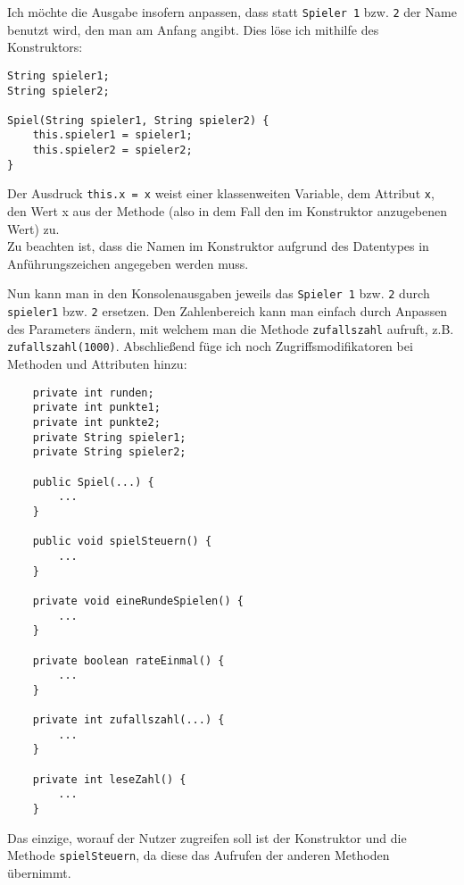 \documentclass{scrartcl}   %
\begin{document}
\begin{itemize}
    \barrow Ich möchte die Ausgabe insofern anpassen, dass statt \texttt{Spieler 1} bzw. \texttt{2} der Name benutzt wird, den man am Anfang angibt. Dies löse ich mithilfe des Konstruktors:\\
    \begin{lstlisting}
String spieler1;
String spieler2;
    
Spiel(String spieler1, String spieler2) {
    this.spieler1 = spieler1;
    this.spieler2 = spieler2;
}
    \end{lstlisting}
    
    Der Ausdruck \texttt{this.x = x} weist einer klassenweiten Variable, dem Attribut \texttt{x}, den Wert x aus der Methode (also in dem Fall den im Konstruktor anzugebenen Wert) zu.\\
    Zu beachten ist, dass die Namen im Konstruktor aufgrund des Datentypes in Anführungszeichen angegeben werden muss.
    
    Nun kann man in den Konsolenausgaben jeweils das \texttt{Spieler 1} bzw. \texttt{2} durch \texttt{spieler1} bzw. \texttt{2} ersetzen.
    \barrow Den Zahlenbereich kann man einfach durch Anpassen des Parameters ändern, mit welchem man die Methode \texttt{zufallszahl} aufruft, z.B. \texttt{zufallszahl(1000)}.
    \barrow Abschließend füge ich noch Zugriffsmodifikatoren bei Methoden und Attributen hinzu:
    
    \begin{lstlisting}
    private int runden;
    private int punkte1;
    private int punkte2;
    private String spieler1;
    private String spieler2;
    
    public Spiel(...) {
        ...
    }
    
    public void spielSteuern() {
        ...
    }
    
    private void eineRundeSpielen() {
        ...
    }
    
    private boolean rateEinmal() {
        ...
    }

    private int zufallszahl(...) {
        ...
    }

    private int leseZahl() {
        ...
    }
    \end{lstlisting}
    
    Das einzige, worauf der Nutzer zugreifen soll ist der Konstruktor und die Methode \texttt{spielSteuern}, da diese das Aufrufen der anderen Methoden übernimmt.
    
\end{itemize}
\end{document}
